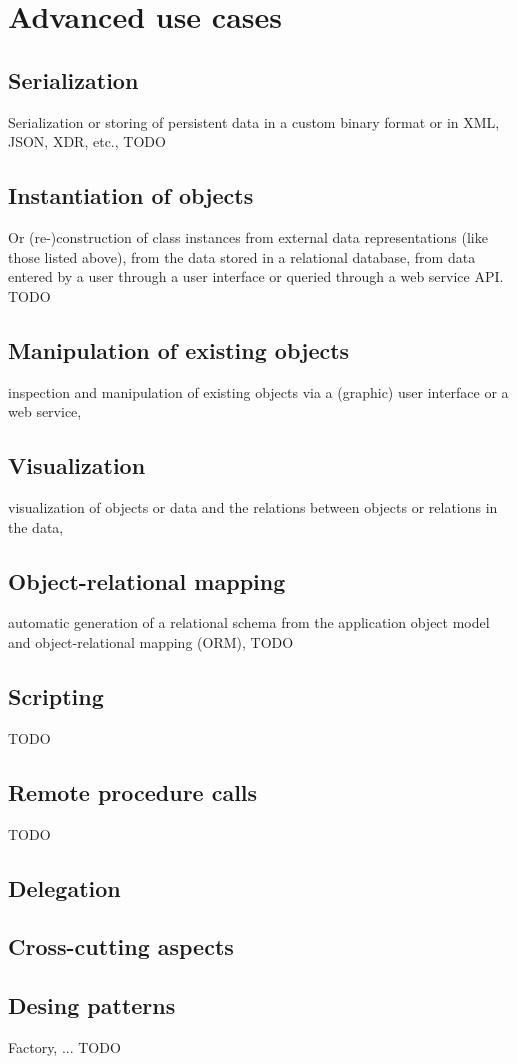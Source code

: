 \section{Advanced use cases}

\subsection{Serialization}

Serialization or storing of persistent data in a
custom binary format or in XML, JSON, XDR, etc.,
TODO

\subsection{Instantiation of objects}

Or (re-)construction of class instances
from external data representations (like those listed above),
from the data stored in a relational database, from data entered by
a user through a user interface or queried through a web service API.
TODO

\subsection{Manipulation of existing objects}
inspection and manipulation of existing objects via a (graphic) user interface
or a web service,

\subsection{Visualization}
visualization of objects or data and the relations between objects or
relations in the data,

\subsection{Object-relational mapping}

automatic generation of a relational schema from the application
object model and object-relational mapping (ORM),
TODO

\subsection{Scripting}

TODO

\subsection{Remote procedure calls}

TODO

\subsection{Delegation}

\subsection{Cross-cutting aspects}

\subsection{Desing patterns}

Factory, ...
TODO

